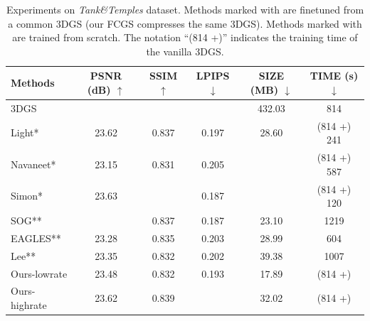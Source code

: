 \documentclass{article} %
\begin{document}
\begin{table}[h]
    \centering
    \caption{Experiments on \textit{Tank\&Temples} dataset. Methods marked with \text{*} are finetuned from a common 3DGS (our FCGS compresses the same 3DGS). Methods marked with \text{**} are trained from scratch. The notation ``(814 +)'' indicates the training time of the vanilla 3DGS. }
    \vspace{10pt}
    \begin{tabular}{lccccc}
        \toprule[2pt]
        \multicolumn{1}{l|}{Methods}        & PSNR (dB) $\uparrow$ & SSIM $\uparrow$ & \multicolumn{1}{c|}{LPIPS $\downarrow$} & \multicolumn{1}{c|}{SIZE (MB) $\downarrow$} & TIME (s) $\downarrow$ \\ \bottomrule
        \multicolumn{1}{l|}{3DGS} & \cellcolor{red!25}{23.71}     & \cellcolor{red!25}{0.845} & \multicolumn{1}{c|}{\cellcolor{red!25}{0.179}} & \multicolumn{1}{c|}{432.03}    & 814      \\ \hline
        \multicolumn{1}{l|}{Light*}         & 23.62     & 0.837 & \multicolumn{1}{c|}{0.197} & \multicolumn{1}{c|}{28.60}     & (814 +) 241      \\
        \multicolumn{1}{l|}{Navaneet*}      & 23.15     & 0.831 & \multicolumn{1}{c|}{0.205} & \multicolumn{1}{c|}{\cellcolor{red!25}{13.64}}     & (814 +) 587      \\
        \multicolumn{1}{l|}{Simon*}         & 23.63     & \cellcolor{yellow!25}{0.842} & \multicolumn{1}{c|}{0.187} & \multicolumn{1}{c|}{\cellcolor{yellow!25}{17.65}}     & (814 +) 120      \\ \hline
        \multicolumn{1}{l|}{SOG**}          & \cellcolor{yellow!25}{23.66}     & 0.837 & \multicolumn{1}{c|}{0.187} & \multicolumn{1}{c|}{23.10}     & 1219     \\
        \multicolumn{1}{l|}{EAGLES**}       & 23.28     & 0.835 & \multicolumn{1}{c|}{0.203} & \multicolumn{1}{c|}{28.99}     & 604      \\
        \multicolumn{1}{l|}{Lee**}          & 23.35     & 0.832 & \multicolumn{1}{c|}{0.202} & \multicolumn{1}{c|}{39.38}     & 1007     \\ \hline
        \multicolumn{1}{l|}{Ours-lowrate}       & 23.48     & 0.832 & \multicolumn{1}{c|}{0.193} & \multicolumn{1}{c|}{17.89}     & (814 +) \cellcolor{red!25}{10 / 16}         \\
        \multicolumn{1}{l|}{Ours-highrate}      & 23.62     & 0.839 & \multicolumn{1}{c|}{\cellcolor{yellow!25}{0.184}} & \multicolumn{1}{c|}{32.02}     & (814 +) \cellcolor{yellow!25}{13 / 24}         \\ \bottomrule[2pt]
    \end{tabular}
    \label{tab:experiments_tt}
\end{table}
\clearpage
\end{document}
